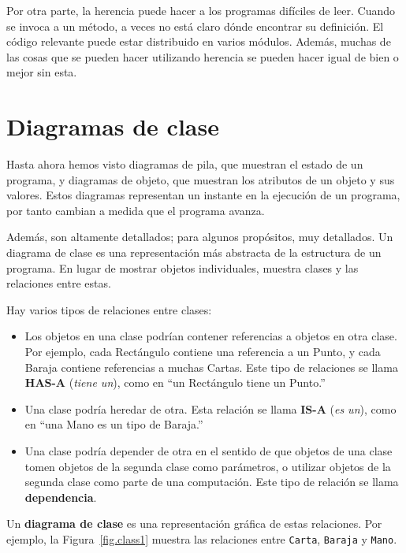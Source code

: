 \documentclass[10pt]{book}
\begin{document}
Por otra parte, la herencia puede hacer a los programas difíciles de leer.
Cuando se invoca a un método, a veces no está claro dónde encontrar su
definición.  El código relevante puede estar distribuido en varios módulos.
Además, muchas de las cosas que se pueden hacer utilizando herencia se pueden
hacer igual de bien o mejor sin esta.


\section{Diagramas de clase}
\label{class.diagram}

Hasta ahora hemos visto diagramas de pila, que muestran el estado de
un programa, y diagramas de objeto, que muestran los atributos
de un objeto y sus valores.  Estos diagramas representan un instante
en la ejecución de un programa, por tanto cambian a medida que el programa
avanza.

Además, son altamente detallados; para algunos propósitos, muy
detallados.  Un diagrama de clase es una representación más abstracta
de la estructura de un programa.  En lugar de mostrar objetos
individuales, muestra clases y las relaciones entre estas.

Hay varios tipos de relaciones entre clases:

\begin{itemize}

\item Los objetos en una clase podrían contener referencias a objetos
en otra clase.  Por ejemplo, cada Rectángulo contiene una referencia
a un Punto, y cada Baraja contiene referencias a muchas Cartas.
Este tipo de relaciones se llama {\bf HAS-A} ({\em tiene un}), como en ``un Rectángulo
tiene un Punto.''

\item Una clase podría heredar de otra.  Esta relación
se llama {\bf IS-A} ({\em es un}), como en ``una Mano es un tipo de Baraja.''

\item Una clase podría depender de otra en el sentido de que objetos
de una clase tomen objetos de la segunda clase como parámetros, o
utilizar objetos de la segunda clase como parte de una computación.  Este
tipo de relación se llama {\bf dependencia}.

\end{itemize}

Un {\bf diagrama de clase} es una representación gráfica de estas
relaciones.  Por ejemplo, la Figura~\ref{fig.class1} muestra las
relaciones entre {\tt Carta}, {\tt Baraja} y {\tt Mano}.
\end{document}
